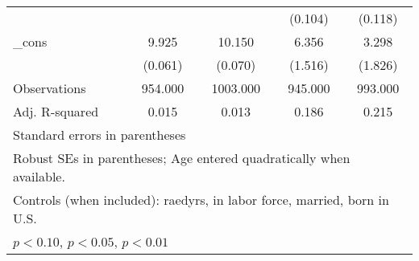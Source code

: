 \begin{table}[htbp]
\begin{tabular}{l*{4}{c}}
          &                  &                  &  (0.104)         &  (0.118)         \\
\_cons    &    9.925\sym{***}&   10.150\sym{***}&    6.356\sym{***}&    3.298\sym{*}  \\
          &  (0.061)         &  (0.070)         &  (1.516)         &  (1.826)         \\
\midrule
Observations&  954.000         & 1003.000         &  945.000         &  993.000         \\
Adj. R-squared&    0.015         &    0.013         &    0.186         &    0.215         \\
\bottomrule
\multicolumn{5}{l}{\footnotesize Standard errors in parentheses}\\
\multicolumn{5}{l}{\footnotesize Robust SEs in parentheses; Age entered quadratically when available.}\\
\multicolumn{5}{l}{\footnotesize Controls (when included): raedyrs, in labor force, married, born in U.S.}\\
\multicolumn{5}{l}{\footnotesize \sym{*} \(p<0.10\), \sym{**} \(p<0.05\), \sym{***} \(p<0.01\)}\\
\end{tabular}
\end{table}
